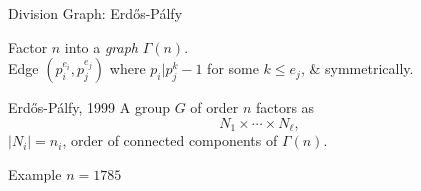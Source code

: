 \documentclass{beamer}
\begin{document}
\begin{frame}{Division Graph: Erd\H{o}s-P\'{a}lfy}

Factor $n$ into a \emph{graph} $\Gamma(n)$.  \\
Edge $(p_i^{e_i},p_j^{e_j})$
where $p_i|p_j^k-1$ for some $k\leq e_j$, \& symmetrically.  

\begin{block}{Erd\H{o}s-P\'{a}lfy, 1999}
    A group $G$ of order $n$ factors as 
\[N_1\times \cdots \times N_{\ell},\] 
$|N_i|=n_i$, order of connected components of $\Gamma(n)$.
\end{block}

\pause

\begin{block}{Example $n=1785$}
\begin{center}
\end{center}
\end{block}


\end{frame}
    
\end{document}
